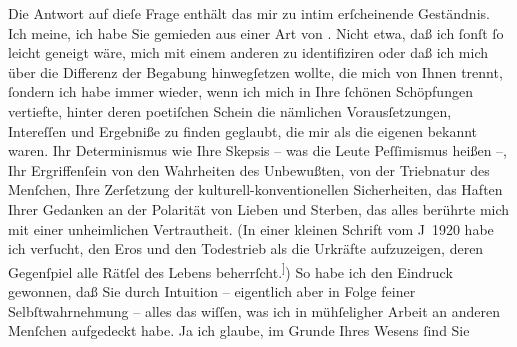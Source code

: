\pstart
           Die Antwort auf dieſe Frage enthält das mir zu intim erſcheinende Geständnis. Ich
               meine, ich habe Sie gemieden aus einer Art von \label{K_L03887-2v}\label{K_L03887-2}. Nicht etwa, daß ich{ }ſonſt{ }ſo leicht geneigt {\pb}wäre, mich mit einem anderen zu
               identifiziren oder daß ich mich über die Differenz der Begabung hinwegſetzen wollte,
               die mich von Ihnen trennt,{ }ſondern ich habe immer wieder, wenn ich mich in Ihre{ }ſchönen Schöpfungen vertiefte, hinter deren poetiſchen Schein die nämlichen
               Vorausſetzungen, Intereſſen und Ergebniße zu finden geglaubt, die mir als die eigenen
               bekannt waren. Ihr Determinismus wie Ihre Skepsis – was die Leute Peſſimismus heißen
               –, Ihr Ergriffenſein von den Wahrheiten des Unbewußten, von der Triebnatur des
               Menſchen, Ihre Zerſetzung der kulturell-konventionellen Sicherheiten, das Haften
               Ihrer Gedanken an der Polarität von Lieben und Sterben, das alles berührte mich mit
               einer unheimlichen Vertrautheit. (In einer kleinen Schrift vom J 1920{ }\label{T_L03887-1v}\label{T_L03887-1}
               habe ich verſucht, den Eros und den Todestrieb als die Urkräfte aufzuzeigen, deren
               Gegenſpiel alle Rätſel des Lebens beherrſcht.\substVorne{}\textsuperscript{]}\substDazwischen{})\substHinten{} So habe ich den Eindruck gewonnen, daß Sie durch Intuition – eigentlich aber
               in Folge feiner Selbſtwahrnehmung – alles das wiſſen, was ich in mühſeligher Arbeit
               an anderen Menſchen aufgedeckt habe. Ja ich glaube, im Grunde Ihres Wesens{ }ſind Sie
